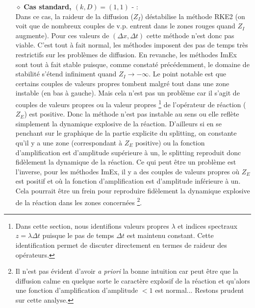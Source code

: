                 \begin{itemize}
                    \item[$\diamond$]\textbf{Cas standard, $(k,D)=(1,1)$} - :\\
                        Dans ce cas, la raideur de la diffusion ($Z_I$) déstabilise la méthode RKE2 (on voit que de nombreux couples de v.p. entrent dans le zones rouges quand $Z_I$ augmente).
                        Pour ces valeurs de $(\Delta x, \Delta t)$ cette méthode n'est donc pas viable.
                        C'est tout à fait normal, les méthodes imposent des pas de temps très restrictifs sur les problèmes de diffusion.
                        En revanche, les méthodes ImEx sont tout à fait stable puisque, comme constaté précédemment, le domaine de stabilité s'étend infiniment quand $Z_I \rightarrow -\infty$.
                        Le point notable est que certains couples de valeurs propres tombent malgré tout dans une zone instable (en bas à gauche). Mais cela n'est pas un problème car il s'agit 
                        de couples de valeurs propres ou la valeur propres
                        \footnote{Dans cette section, nous identifions valeurs propres $\lambda$ et indices spectraux $z = \lambda \Delta t$ puisque le pas de temps $\Delta t$ est maintenu constant. Cette identification permet de discuter directement en termes de raideur des opérateurs.}
                        de l'opérateur de réaction ($Z_E$) est positive. Donc la méthode n'est pas instable au sens ou elle reflète simplement
                        la dynamique explosive de la réaction. D'ailleurs si en se penchant sur le graphique de la partie explicite du splitting, on constante qu'il y a une zone 
                        (correspondant à $Z_E$ positive) ou la fonction d'amplification est d'amplitude supérieure à un, le splitting reproduit donc fidèlement la dynamique de la réaction.
                        Ce qui peut être un problème est l'inverse, 
                        pour les méthodes ImEx, il y a des couples de valeurs propres où $Z_E$ est positif et où la fonction d'amplification est d'amplitude inférieure à un. 
                        Cela pourrait être un frein pour reproduire fidèlement la dynamique explosive de la réaction dans les zones concernées
                        \footnote{Il n'est pas évident d'avoir \textit{a priori} la bonne intuition car peut être que la diffusion calme en quelque sorte 
                        le caractère explosif de la réaction et qu'alors une fonction d'amplification d'amplitude $< 1$ est normal... Restons prudent sur cette analyse.}.

\end{itemize}
